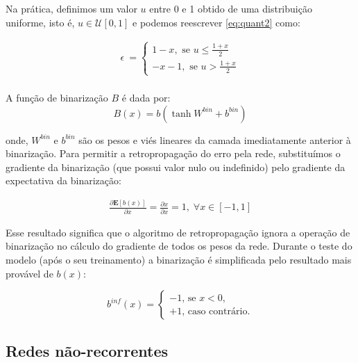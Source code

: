Na prática, definimos um valor $u$ entre 0 e 1 obtido de uma distribuição uniforme, isto é,  $u \in \mathcal{U}[0,1]$ e podemos reescrever \ref{eq:quant2} como:

\begin{equation}
\label{eq:quant}
\begin{aligned}
\epsilon \ = \left\{
\begin{array}{ll}
1 - x, \text{ se $u$}  \leq \frac{1 + x}{2} \\
-x - 1, \text{ se $u$} > \frac{1 + x}{2}
\end{array}
\right. \\
\end{aligned}
\end{equation}


A função de binarização $B$ é dada por: 
\begin{equation}
B(x) = b(\tanh{W^{bin} + b^{bin}})
\end{equation}

onde, $W^{bin}$ e $b^{bin}$ são os pesos e viés lineares da camada imediatamente anterior à binarização. Para permitir a retropropagação do erro pela rede, substituímos o gradiente da binarização (que possui valor nulo ou indefinido) pelo gradiente da expectativa da binarização:

\begin{equation}
\begin{aligned}
\displaystyle \frac{\partial \mathbf{E}[b(x)]}{\partial x} = \displaystyle \frac{\partial x}{\partial x} =1,  \; \forall x \in [-1, 1] 
\end{aligned}
\end{equation}

Esse resultado significa que o algoritmo de retropropagação ignora a operação de binarização no cálculo do gradiente de todos os pesos da rede. 
Durante o teste do modelo (após o seu treinamento) a binarização é simplificada pelo resultado mais provável de $b(x)$:

\begin{equation}
b^{inf}(x) = \left\{
\begin{array}{ll}
-1 \text{, se } x < 0, \\
+1 \text{, caso contrário}.
\end{array}
\right. 
\end{equation}

\subsection{Redes não-recorrentes}

